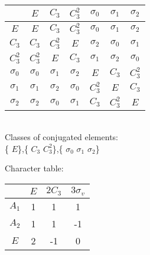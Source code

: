 \documentclass[12pt]{report}
\begin{document}
 
 
\newcommand{\rr}{\boldsymbol{r}} 
\newcommand{\kk}{\boldsymbol{k}} 
\newcommand{\RR}{\boldsymbol{R}} 
\newcommand{\fsp}{\mbox{ }} 
\renewcommand{\le}{\leqslant} 
\renewcommand{\ge}{\geqslant} 
\newcommand{\ds}{\displaystyle} 
\newcommand{\eps}{\varepsilon} 
\newcommand{\fmbr}{\begin{array}{c}} 
\newcommand{\fm}{\end{array}} 
\newcommand{\ra}{{\rightarrow}} 
\newcommand{\eq}{\begin{equation}} 
\newcommand{\eeq}{\end{equation}} 
\newcommand{\arsh}{\mathop{\rm arsh}\nolimits} 
 

\begin{tabular}{c | c c c c c c } 
& $E$& $C_3$& $C_3^2$& $\sigma_0$& $\sigma_1$& $\sigma_2$\\ 
 \hline 
 $E$& $E$& $C_3$& $C_3^2$& $\sigma_0$& $\sigma_1$& $\sigma_2$\\
$C_3$& $C_3$& $C_3^2$& $E$& $\sigma_2$& $\sigma_0$& $\sigma_1$\\
$C_3^2$& $C_3^2$& $E$& $C_3$& $\sigma_1$& $\sigma_2$& $\sigma_0$\\
$\sigma_0$& $\sigma_0$& $\sigma_1$& $\sigma_2$& $E$& $C_3$& $C_3^2$\\
$\sigma_1$& $\sigma_1$& $\sigma_2$& $\sigma_0$& $C_3^2$& $E$& $C_3$\\
$\sigma_2$& $\sigma_2$& $\sigma_0$& $\sigma_1$& $C_3$& $C_3^2$& $E$\\
\end{tabular}

\\
Classes of conjugated elements:
\\
\{ $E$\},\{ $C_3$ $C_3^2$\},\{ $\sigma_0$ $\sigma_1$ $\sigma_2$\}

Character table:


\begin{tabular}{c | c c c } 
& $E$& $2C_3$& $3\sigma_v$\\ 
 \hline 
$A_1$& 1& 1& 1\\
$A_2$& 1& 1& -1\\
 $E$& 2& -1& 0\\
\end{tabular}
\end{document}
